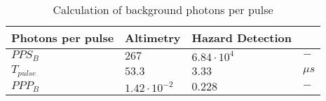 \begin{table}[h]
\centering
\caption{Calculation of background photons per pulse}
\label{tab:PPP_B}
\begin{tabular}{|l|lll|} \hline
\textbf{Photons per pulse} & \textbf{Altimetry} & \textbf{Hazard Detection} &      \\ \hline
$PPS_B$         & $267$              & $6.84\cdot10^4$           & $-$     \\
$T_{pulse}$     & $53.3$             & $3.33$                    & $\mu s$ \\
$PPP_B$         & $1.42\cdot10^{-2}$ & $0.228$                   & $-$     \\ \hline
\end{tabular}
\end{table}